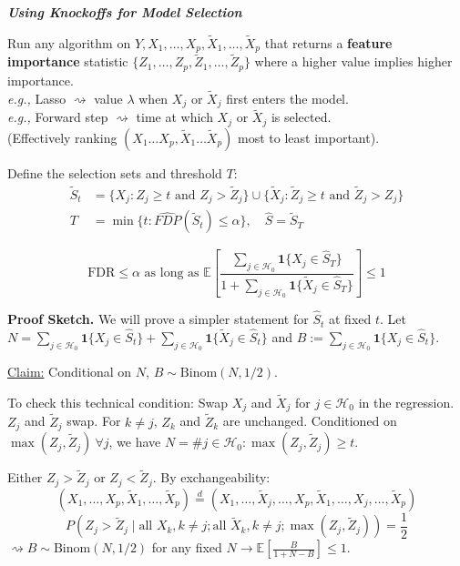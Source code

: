 \emph{\textbf{Using Knockoffs for Model Selection}}

Run any algorithm on $Y, X_1, \dots, X_p, \tilde{X}_1, \dots, \tilde{X}_p$ that returns a \textbf{feature importance} statistic $\{Z_1, \dots, Z_p, \tilde{Z}_1, \dots, \tilde{Z}_p\}$ where a higher value implies higher importance. \\
\textit{e.g.,} Lasso $\rightsquigarrow$ value $\lambda$ when $X_j$ or $\tilde{X}_j$ first enters the model. \\
\textit{e.g.,} Forward step $\rightsquigarrow$ time at which $X_j$ or $\tilde{X}_j$ is selected. \\
(Effectively ranking $(X_1 \dots X_p, \tilde{X}_1 \dots \tilde{X}_p)$ most to least important).

Define the selection sets and threshold $T$:
\begin{align*}
    \tilde{S}_t &= \{X_j : Z_j \ge t \text{ and } Z_j > \tilde{Z}_j\} \cup \{\tilde{X}_j : \tilde{Z}_j \ge t \text{ and } \tilde{Z}_j > Z_j\} \\
    T &= \min \{t : \widehat{FDP}(\tilde{S}_t) \le \alpha \}, \quad \hat{S} = \tilde{S}_T
\end{align*}

$$ \text{FDR} \le \alpha \text{ as long as } \mathbb{E} \left[ \frac{\sum_{j \in \mathcal{H}_0} \mathbf{1}\{X_j \in \hat{S}_T\}}{1 + \sum_{j \in \mathcal{H}_0} \mathbf{1}\{\tilde{X}_j \in \hat{S}_T\}} \right] \le 1 $$

\textbf{Proof Sketch.}
We will prove a simpler statement for $\hat{S}_t$ at fixed $t$. Let $N = \sum_{j \in \mathcal{H}_0} \mathbf{1}\{X_j \in \hat{S}_t\} + \sum_{j \in \mathcal{H}_0} \mathbf{1}\{\tilde{X}_j \in \hat{S}_t\}$ and $B:= \sum_{j \in \mathcal{H}_0} \mathbf{1}\{X_j \in \hat{S}_t\}$.

\noindent \underline{Claim:} Conditional on $N$, $B \sim \text{Binom}(N, 1/2)$.

\noindent To check this technical condition: Swap $X_j$ and $\tilde{X}_j$ for $j \in \mathcal{H}_0$ in the regression. $Z_j$ and $\tilde{Z}_j$ swap. For $k \neq j$, $Z_k$ and $\tilde{Z}_k$ are unchanged. Conditioned on $\max(Z_j, \tilde{Z}_j) \ \forall j$, we have $N = \# j \in \mathcal{H}_0 : \max(Z_j, \tilde{Z}_j) \ge t$.

Either $Z_j > \tilde{Z}_j$ or $Z_j < \tilde{Z}_j$. By exchangeability:
$$ (X_1, \dots, X_p, \tilde{X}_1, \dots, \tilde{X}_p) \stackrel{d}{=} (X_1, \dots, \tilde{X}_j, \dots, X_p, \tilde{X}_1, \dots, X_j, \dots, \tilde{X}_p) $$
$$ P\left(Z_j > \tilde{Z}_j \mid \text{all } X_k, k \neq j; \text{all } \tilde{X}_k, k \neq j; \max(Z_j, \tilde{Z}_j)\right) = \frac{1}{2} $$
$\rightsquigarrow B \sim \text{Binom}(N, 1/2)$ for any fixed $N \rightarrow \mathbb{E}\left[\frac{B}{1+N-B}\right] \le 1$.

